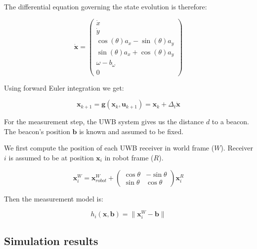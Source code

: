 \documentclass[a4paper, 12pt]{scrreprt}
\begin{document}
The differential equation governing the state evolution is therefore:

\begin{equation}
\mathbf{\dot{x}} = \begin{pmatrix}
\dot{x}\\
\dot{y}\\
\cos(\theta) a_x - \sin(\theta) a_y \\
\sin(\theta) a_x + \cos(\theta) a_y \\
\omega - b_{\omega}\\
0
\end{pmatrix}
\end{equation}

Using forward Euler integration we get:

\begin{equation}
    \mathbf{x}_{k+1} = \mathbf{g}(\mathbf{x}_k, \mathbf{u}_{k+1}) = \mathbf{x}_{k} + \Delta_t \mathbf{\dot{x}}
\end{equation}

For the measurement step, the UWB system gives us the distance $d$ to a beacon.
The beacon's position $\mathbf{b}$ is known and assumed to be fixed.

We first compute the position of each UWB receiver in world frame ($W$).
Receiver $i$ is assumed to be at position $\mathbf{x}_{i}$ in robot frame ($R$).

\begin{equation}
\mathbf{x}_{i}^W = \mathbf{x}_{robot}^W + \begin{pmatrix}
\cos \theta & - \sin \theta \\
\sin \theta & \cos \theta
\end{pmatrix} \mathbf{x}_{i}^R
\end{equation}

Then the measurement model is:

\begin{equation}
    h_i(\mathbf{x}, \mathbf{b}) = \lVert \mathbf{x}_i^W - \mathbf{b} \rVert
\end{equation}

\subsection{Simulation results}
\end{document}
